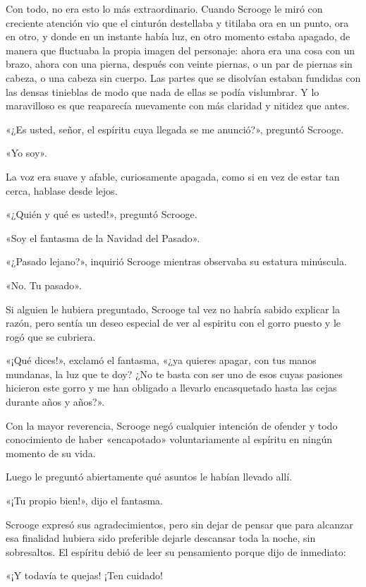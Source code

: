\documentclass{novela}
\begin{document}
 Con todo, no era esto lo más extraordinario. Cuando Scrooge le miró con creciente atención vio que el cinturón destellaba y titilaba ora en un punto, ora en otro, y donde en un instante había luz, en otro momento estaba apagado, de manera que fluctuaba la propia imagen del personaje: ahora era una cosa con un brazo, ahora con una pierna, después con veinte piernas, o un par de piernas sin cabeza, o una cabeza sin cuerpo. Las partes que se disolvían estaban fundidas con las densas tinieblas de modo que nada de ellas se podía vislumbrar. Y lo maravilloso es que reaparecía nuevamente con más claridad y nitidez que antes.

 «¿Es usted, señor, el espíritu cuya llegada se me anunció?», preguntó Scrooge.

 «Yo soy».

 La voz era suave y afable, curiosamente apagada, como si en vez de estar tan cerca, hablase desde lejos.

 «¿Quién y qué es usted!», preguntó Scrooge.

 «Soy el fantasma de la Navidad del Pasado».

 «¿Pasado lejano?», inquirió Scrooge mientras observaba su estatura minúscula.

 «No. Tu pasado».

 Si alguien le hubiera preguntado, Scrooge tal vez no habría sabido explicar la razón, pero sentía un deseo especial de ver al espiritu con el gorro puesto y le rogó que se cubriera.

 «¡Qué dices!», exclamó el fantasma, «¿ya quieres apagar, con tus manos mundanas, la luz que te doy? ¿No te basta con ser uno de esos cuyas pasiones hicieron este gorro y me han obligado a llevarlo encasquetado hasta las cejas durante años y años?».

 Con la mayor reverencia, Scrooge negó cualquier intención de ofender y todo conocimiento de haber «encapotado» voluntariamente al espíritu en ningún momento de su vida.

 Luego le preguntó abiertamente qué asuntos le habían llevado allí.

 «¡Tu propio bien!», dijo el fantasma.

 Scrooge expresó sus agradecimientos, pero sin dejar de pensar que para alcanzar esa finalidad hubiera sido preferible dejarle descansar toda la noche, sin sobresaltos. El espíritu debió de leer su pensamiento porque dijo de inmediato:

 «¡Y todavía te quejas! ¡Ten cuidado!
\end{document}
